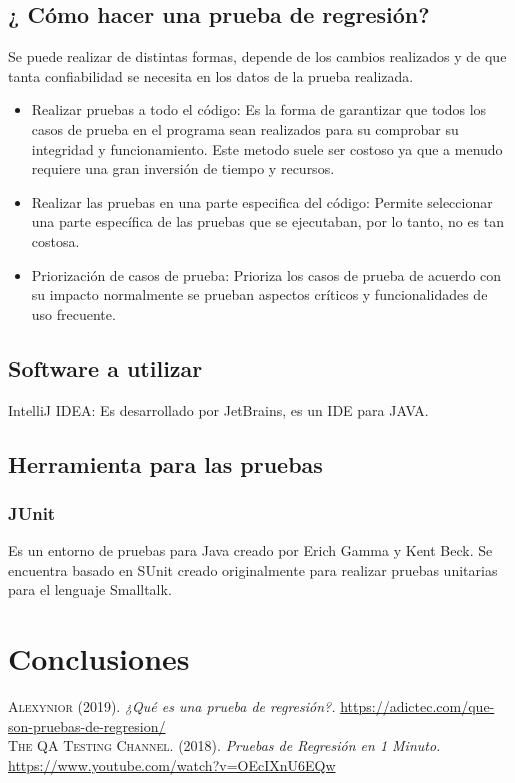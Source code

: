 \documentclass[conference]{IEEEtran}
\begin{document}
\subsection{¿ Cómo hacer una prueba de regresión?}

Se puede realizar de distintas formas, depende de los cambios realizados y de que tanta confiabilidad se necesita en los datos de la prueba realizada.

\begin{itemize}

\item Realizar pruebas a todo el código: Es la forma de garantizar que todos los casos de prueba en el programa sean realizados para su comprobar su integridad y funcionamiento. Este metodo suele ser costoso ya que a menudo requiere una gran inversión de tiempo y recursos.


\item Realizar las pruebas en una parte especifica del código:   
Permite seleccionar una parte específica de las pruebas que se ejecutaban, por lo tanto, no es tan costosa.

\item Priorización de casos de prueba: Prioriza los casos de prueba de acuerdo con su impacto normalmente se prueban aspectos críticos y funcionalidades de uso frecuente.

\end{itemize}


\subsection{Software a utilizar}

IntelliJ IDEA: Es desarrollado por JetBrains, es un IDE para JAVA.

\subsection{Herramienta para las pruebas}
	
\subsubsection{JUnit}

Es un entorno de pruebas para Java creado por Erich Gamma y Kent Beck. Se encuentra basado en SUnit creado originalmente para realizar pruebas unitarias para el lenguaje Smalltalk.

\section{Conclusiones}

\normalsize

\begin{thebibliography}{}
 \textsc{Alexynior} (2019). \textit{¿Qué es una prueba de regresión?.} \url{https://adictec.com/que-son-pruebas-de-regresion/}\\

 \textsc{The QA Testing Channel.} (2018). \textit{Pruebas de Regresión en 1 Minuto.} \url{https://www.youtube.com/watch?v=OEcIXnU6EQw} \\
\end{thebibliography}
\end{document}
